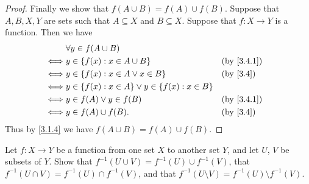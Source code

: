 \begin{proof}
  Finally we show that \(f(A \cup B) = f(A) \cup f(B)\).
  Suppose that \(A, B, X, Y\) are sets such that \(A \subseteq X\) and \(B \subseteq X\).
  Suppose that \(f : X \to Y\) is a function.
  Then we have
  \begin{align*}
         & \forall y \in f(A \cup B)                                                              \\
    \iff & y \in \set{f(x) : x \in A \cup B}                          &  & \by{3.4.1}             \\
    \iff & y \in \set{f(x) : x \in A \lor x \in B}                    &  & \text{(by \cref{3.4})} \\
    \iff & y \in \set{f(x) : x \in A} \lor y \in \set{f(x) : x \in B}                             \\
    \iff & y \in f(A) \lor y \in f(B)                                 &  & \by{3.4.1}             \\
    \iff & y \in f(A) \cup f(B).                                      &  & \text{(by \cref{3.4})}
  \end{align*}
  Thus by \cref{3.1.4} we have \(f(A \cup B) = f(A) \cup f(B)\).
\end{proof}

\begin{ex}\label{ex:3.4.4}
  Let \(f : X \to Y\) be a function from one set \(X\) to another set \(Y\), and let \(U\), \(V\) be subsets of \(Y\). Show that \(f^{-1}(U \cup V) = f^{-1}(U) \cup f^{-1}(V)\), that
  \(f^{-1}(U \cap V) = f^{-1}(U) \cap f^{-1}(V)\), and that \(f^{-1}(U \setminus V) = f^{-1}(U) \setminus f^{-1}(V)\).
\end{ex}

